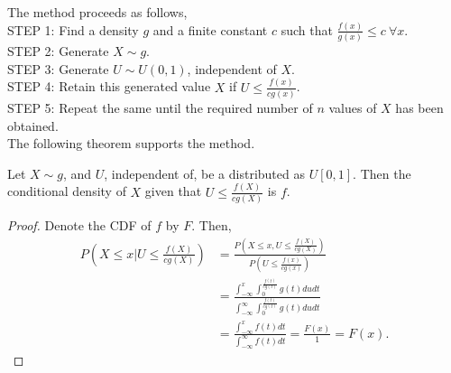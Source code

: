 The method proceeds as follows, \\
     STEP 1: Find a density $g$ and a finite constant  $c$ such that  $\frac{f(x)}{g(x)}\le c \ \forall x$.\\
     STEP 2: Generate $X\sim g$.\\
     STEP 3: Generate  $U\sim U(0,1)$, independent of  $X$. \\
     STEP 4: Retain this generated value  $X$ if  $U\le \frac{f(x)}{cg(x)}$.\\
     STEP 5: Repeat the same until the required number of $n$ values of  $X$ has been obtained.\\

The following theorem supports the method.
\begin{theorem}
    Let $X\sim g$, and  $U$, independent of, be a distributed as $U[0,1]$. Then the conditional density of $X$ given that
    $U\le \frac{f(X)}{cg(X)}$ is $f$.
\end{theorem}
\begin{proof}
    Denote the CDF of $f$ by $F$. Then,
    \begin{align*}
        P\left( X\le x|U\le \frac{f(X)}{cg(X)} \right) &= \frac{P\left( X\le x, U\le \frac{f(X)}{cg(X)} \right)}{P\left( U\le \frac{f(x)}{cg(x)} \right)}\\ 
                                                       &= \frac{\int_{-\infty}^{x}\int_{0}^{\frac{f(t)}{cg(t)}}g(t)dudt}{\int_{-\infty}^{\infty}\int_0^{\frac{f(t)}{cg(t)}}g(t)dudt}\\ 
                                                       &= \frac{\int_{-\infty}^{x}f(t)dt}{\int_{-\infty}^{\infty}f(t)dt} = \frac{F(x)}{1}= F(x).
    \end{align*}
\end{proof}

